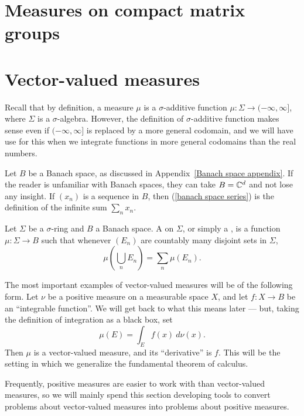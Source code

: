 \section{Measures on compact matrix groups}


\section{Vector-valued measures}
Recall that by definition, a measure $\mu$ is a $\sigma$-additive function $\mu: \Sigma \to (-\infty, \infty]$, where $\Sigma$ is a $\sigma$-algebra.
However, the definition of $\sigma$-additive function makes sense even if $(-\infty, \infty]$ is replaced by a more general codomain, and we will have use for this when we integrate functions in more general codomains than the real numbers.

\begin{subsec}
Let $B$ be a Banach space, as discussed in Appendix~\ref{Banach space appendix}.
If the reader is unfamiliar with Banach spaces, they can take $B = \mathbb{C}^{d}$ and not lose any insight.
If $(x_{n})$ is a sequence in $B$, then (\ref{banach space series}) is the definition of the infinite sum $\sum_{n} x_{n}$.
\end{subsec}

\begin{definition}
Let $\Sigma$ be a $\sigma$-ring and $B$ a Banach space.
A  on $\Sigma$, or simply a , is a function $\mu: \Sigma \to B$ such that whenever $(E_{n})$ are countably many disjoint sets in $\Sigma$,
\[\mu\left(\bigcup_{n} E_{n}\right) = \sum_{n} \mu(E_{n}).\]
\end{definition}

\begin{example}
The most important examples of vector-valued measures will be of the following form.
Let $\nu$ be a positive measure on a measurable space $X$, and let $f: X \to B$ be an ``integrable function''.
We will get back to what this means later --- but, taking the definition of integration as a black box, set
\[\mu(E) = \int_{E} f(x) ~d\nu(x).\]
Then $\mu$ is a vector-valued measure, and its ``derivative'' is $f$.
This will be the setting in which we generalize the fundamental theorem of calculus.
\end{example}

\begin{subsec}
Frequently, positive measures are easier to work with than vector-valued measures, so we will mainly spend this section developing tools to convert problems about vector-valued measures into problems about positive measures.
\end{subsec}

